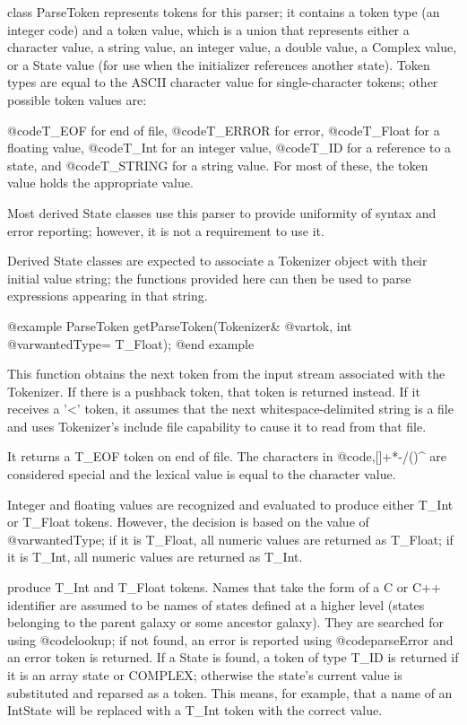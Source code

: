 class ParseToken represents tokens for this parser; it contains a
token type (an integer code) and a token value, which is a
union that represents either a character value, a string value, an
integer value, a double value, a Complex value, or a State value
(for use when the initializer references another state).  Token
types are equal to the ASCII character value for single-character
tokens; other possible token values are:

@code{T_EOF} for end of file, @code{T_ERROR} for error, @code{T_Float}
for a floating value, @code{T_Int} for an integer value, @code{T_ID}
for a reference to a state, and @code{T_STRING} for a string value.
For most of these, the token value holds the appropriate value.

Most derived State classes use this parser to provide uniformity
of syntax and error reporting; however, it is not a requirement to
use it.

Derived State classes are expected to associate a Tokenizer object
with their initial value string; the functions provided here can
then be used to parse expressions appearing in that string.

@example
ParseToken getParseToken(Tokenizer& @var{tok}, int @var{wantedType}= T_Float);
@end example

This function obtains the next token from the input stream associated
with the Tokenizer.  If there is a pushback token, that token is
returned instead.  If it receives a '<' token, it assumes that the
next whitespace-delimited string is a file and uses Tokenizer's include
file capability to cause it to read from that file.

It returns a T_EOF token on end of file.  The characters in @code{,[]+*-/()^}
are considered special and the lexical value is equal to the character
value.

Integer and floating values are recognized and evaluated to produce
either T_Int or T_Float tokens.  However, the decision is based on
the value of @var{wantedType}; if it is T_Float, all numeric values
are returned as T_Float; if it is T_Int, all numeric values are returned
as T_Int.

produce T_Int and T_Float tokens.  Names that take the form of a
C or C++ identifier are assumed to be names of states defined at a
higher level (states belonging to the parent galaxy or some ancestor
galaxy).  They are searched for using @code{lookup}; if not found,
an error is reported using @code{parseError} and an error token is
returned.  If a State is found, a token of type T_ID is returned if
it is an array state or COMPLEX; otherwise the state's current value
is substituted and reparsed as a token.  This means, for example, that
a name of an IntState will be replaced with a T_Int token with the
correct value.

